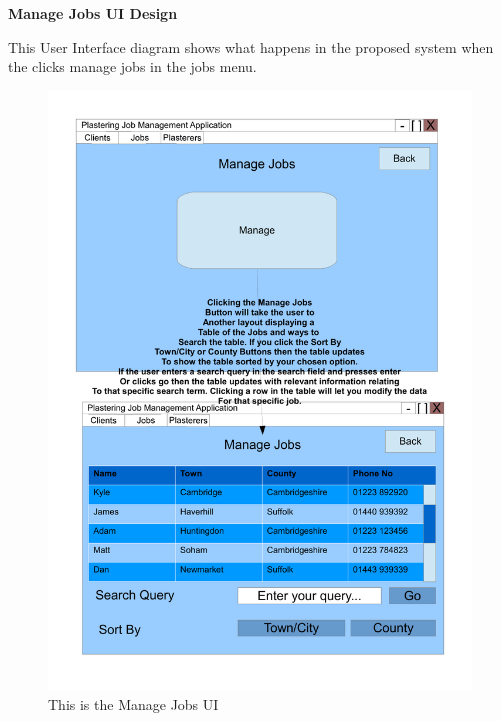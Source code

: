 \pagebreak
\textbf{Manage Jobs UI Design}
\begin{flushleft}
This User Interface diagram shows what happens in the proposed system when the clicks manage jobs in the jobs menu.
\end{flushleft}
\begin{figure}[H]
\includegraphics[scale=0.5]{./Design/images/ManageJobs.pdf}
    \caption{This is the Manage Jobs UI} 
\label{fig:FlowChartManageJobs}
\end{figure}



